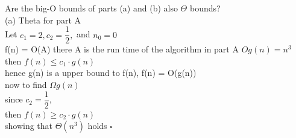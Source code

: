 \documentclass[12pt]{article}
\begin{document}
Are the big-O bounds of parts (a) and (b) also $\Theta$ bounds?\\
(a) Theta for part A\\
Let $c_1 = 2, c_2 = \dfrac{1}{2},$ and $n_0 = 0$\\ 
f(n) = O(A) there A is the run time of the algorithm in part A $Og(n) = n^3$\\
then $f(n)\leq c_1 \cdot g(n)$\\
hence  g(n) is a upper bound to f(n), f(n) = O(g(n))\\
now to find $\Omega g(n)$\\
since $c_2 = \dfrac{1}{2},$ \\
then $f(n) \geq c_2 \cdot g(n)$\\
showing that $\Theta (n^3)$ holds $\square$\\
%
%
%
\pagebreak[4]
\end{document}
